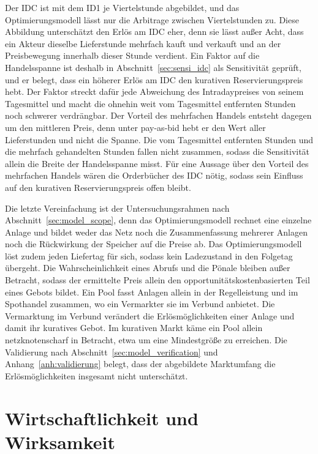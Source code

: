 Der \ac{IDC} ist mit dem \ac{ID1} je Viertelstunde abgebildet, und das Optimierungsmodell lässt nur die Arbitrage zwischen Viertelstunden zu.
Diese Abbildung unterschätzt den Erlös am \ac{IDC} eher, denn sie lässt außer Acht, dass ein Akteur dieselbe Lieferstunde mehrfach kauft und verkauft und an der Preisbewegung innerhalb dieser Stunde verdient.
Ein Faktor auf die Handelsspanne ist deshalb in Abschnitt~\ref{sec:sensi_idc} als Sensitivität geprüft, und er belegt, dass ein höherer Erlös am \ac{IDC} den kurativen Reservierungspreis hebt.
Der Faktor streckt dafür jede Abweichung des Intradaypreises von seinem Tagesmittel und macht die ohnehin weit vom Tagesmittel entfernten Stunden noch schwerer verdrängbar.
Der Vorteil des mehrfachen Handels entsteht dagegen um den mittleren Preis, denn unter pay-as-bid hebt er den Wert aller Lieferstunden und nicht die Spanne.
Die vom Tagesmittel entfernten Stunden und die mehrfach gehandelten Stunden fallen nicht zusammen, sodass die Sensitivität allein die Breite der Handelsspanne misst.
Für eine Aussage über den Vorteil des mehrfachen Handels wären die Orderbücher des \ac{IDC} nötig, sodass sein Einfluss auf den kurativen Reservierungspreis offen bleibt.

Die letzte Vereinfachung ist der Untersuchungsrahmen nach Abschnitt~\ref{sec:model_scope}, denn das Optimierungsmodell rechnet eine einzelne Anlage und bildet weder das Netz noch die Zusammenfassung mehrerer Anlagen noch die Rückwirkung der Speicher auf die Preise ab.
Das Optimierungsmodell löst zudem jeden Liefertag für sich, sodass kein Ladezustand in den Folgetag übergeht.
Die Wahrscheinlichkeit eines Abrufs und die Pönale bleiben außer Betracht, sodass der ermittelte Preis allein den opportunitätskostenbasierten Teil eines Gebots bildet.
Ein Pool fasst Anlagen allein in der Regelleistung und im Spothandel zusammen, wo ein Vermarkter sie im Verbund anbietet.
Die Vermarktung im Verbund verändert die Erlösmöglichkeiten einer Anlage und damit ihr kuratives Gebot.
Im kurativen Markt käme ein Pool allein netzknotenscharf in Betracht, etwa um eine Mindestgröße zu erreichen.
Die Validierung nach Abschnitt~\ref{sec:model_verification} und Anhang~\ref{anh:validierung} belegt, dass der abgebildete Marktumfang die Erlösmöglichkeiten insgesamt nicht unterschätzt.

\section{Wirtschaftlichkeit und Wirksamkeit}
\label{sec:economics_effectiveness}

